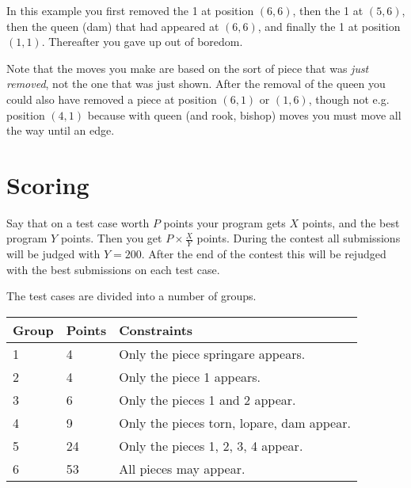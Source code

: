 In this example you first removed the 1 at position $(6, 6)$, then the 1 at $(5, 6)$, then the queen (dam) that had appeared at $(6, 6)$, and finally the 1 at position $(1, 1)$. Thereafter you gave up out of boredom.

Note that the moves you make are based on the sort of piece that was \emph{just removed}, not the one that was just shown. After the removal of the queen you could also have removed a piece at position $(6, 1)$ or $(1, 6)$, though not e.g. position $(4, 1)$ because with queen (and rook, bishop) moves you must move all the way until an edge.

\section*{Scoring}
Say that on a test case worth $P$ points your program gets $X$ points, and the best program $Y$ points.
Then you get $P \times \frac X Y$ points. During the contest all submissions will be judged with $Y = 200$. After the end of the contest this will be rejudged with the best submissions on each test case.

The test cases are divided into a number of groups.

\begin{tabular}{| l | l | l |}
  \hline
	Group & Points & Constraints\\ \hline
  1     & 4          & Only the piece springare appears. \\ \hline
  2     & 4          & Only the piece 1 appears. \\ \hline
  3     & 6          & Only the pieces 1 and 2 appear. \\ \hline
  4     & 9          & Only the pieces torn, lopare, dam appear. \\ \hline
  5     & 24         & Only the pieces 1, 2, 3, 4 appear. \\ \hline
  6     & 53         & All pieces may appear. \\ \hline
\end{tabular}

